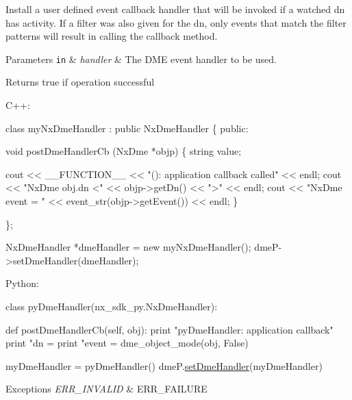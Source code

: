 Install a user defined event callback handler that will be invoked if a watched dn has activity. If a filter was also given for the dn, only events that match the filter patterns will result in calling the callback method. 
\begin{DoxyParams}[1]{Parameters}
\mbox{\tt in}  & {\em handler} & The D\+ME event handler to be used. \\
\hline
\end{DoxyParams}
\begin{DoxyReturn}{Returns}
true if operation successful 
\begin{DoxyCode}
  C++:

    \textcolor{keyword}{class }myNxDmeHandler : \textcolor{keyword}{public} NxDmeHandler \{
    \textcolor{keyword}{public}:

      \textcolor{keywordtype}{void} postDmeHandlerCb (NxDme *objp)
      \{
        \textcolor{keywordtype}{string} value;

        cout << \_\_FUNCTION\_\_ << \textcolor{stringliteral}{"(): application callback called"}
                     << endl;
        cout << \textcolor{stringliteral}{"NxDme obj.dn <"} << objp->getDn() << \textcolor{stringliteral}{">"} << endl;
        cout << \textcolor{stringliteral}{"NxDme event = "} << event\_str(objp->getEvent())
                    << endl;
      \}

    \};

    NxDmeHandler *dmeHandler = \textcolor{keyword}{new} myNxDmeHandler();
    dmeP->setDmeHandler(dmeHandler);

Python:

   \textcolor{keyword}{class }pyDmeHandler(nx\_sdk\_py.NxDmeHandler):

       def postDmeHandlerCb(self, obj):
          print "pyDmeHandler: application callback"
          print "dn = %
          print "event = %
          dme\_object\_mode(obj, False)

    myDmeHandler = pyDmeHandler()
    dmeP.\mbox{\hyperlink{classnxos_1_1_nx_dme_mgr_a3d7e9ce8c28586d834f1504856e22988}{setDmeHandler}}(myDmeHandler)
\end{DoxyCode}

\end{DoxyReturn}

\begin{DoxyExceptions}{Exceptions}
{\em E\+R\+R\+\_\+\+I\+N\+V\+A\+L\+ID} & E\+R\+R\+\_\+\+F\+A\+I\+L\+U\+RE \\
\hline
\end{DoxyExceptions}
\mbox{\label{classnxos_1_1_nx_dme_mgr_a96f2b81fd3c248cb1408c95330ae6962}} 
